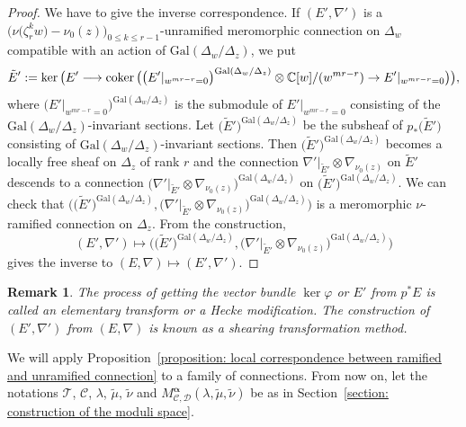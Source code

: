 \documentclass[pdftex]{sigma}
\numberwithin{equation}{section}
\newtheorem{Remark}[Theorem]{Remark}
\newcommand\coker{\mathop{\rm coker}\nolimits}
\newcommand{\balpha}{\boldsymbol \alpha}
\begin{document}
\begin{proof}
We have to give the inverse correspondence.
If $(E',\nabla')$ is a $\big(\nu\big(\zeta_r^kw\big)-\nu_0(z)\big)_{0\leq k\leq r-1}$-unramified
meromorphic connection on $\Delta_w$
compatible with an action of
$\mathrm{Gal}(\Delta_w/\Delta_z)$,
we put
\[
 \tilde{E}':=
 \ker\big( E' \longrightarrow
 \coker \big(
 \big( E'|_{w^{mr-r}=0} \big)^{ \mathrm{Gal}(\Delta_w/\Delta_z) }
 \otimes \mathbb{C}[w]/(w^{mr-r})
 \rightarrow E'|_{w^{mr-r}=0} \big) \big),
\]
where $\big( E'|_{w^{mr-r}=0} \big)^{ \mathrm{Gal}(\Delta_w/\Delta_z) }$
is the submodule of $E'|_{w^{mr-r}=0}$
consisting of the $\mathrm{Gal}(\Delta_w/\Delta_z)$-invariant sections.
Let $\big( \tilde{E}' \big)^{\mathrm{Gal}(\Delta_w/\Delta_z)}$
be the subsheaf of
$p_*\big(\tilde{E}'\big)$
consisting of $\mathrm{Gal}(\Delta_w/\Delta_z)$-invariant sections.
Then $\big( \tilde{E}' \big)^{\mathrm{Gal}(\Delta_w/\Delta_z)}$
becomes a locally free sheaf on $\Delta_z$ of rank $r$
and the connection
$\nabla'\big|_{\tilde{E}'}\otimes\nabla_{\nu_0(z)}$
on $\tilde{E}'$ descends to a connection
$\big( \nabla' \big|_{ \tilde{E}' } \otimes\nabla_{\nu_0(z)} \big) ^{ \mathrm{Gal}(\Delta_w/\Delta_z) }$
on $\big(\tilde{E}'\big)^{ \mathrm{Gal}(\Delta_w/\Delta_z) }$.
We can check that
$
 \big( \big(\tilde{E}'\big)^{ \mathrm{Gal}(\Delta_w/\Delta_z) } ,
 \big( \nabla' \big|_{ \tilde{E}' } \otimes\nabla_{\nu_0(z)} \big) ^{ \mathrm{Gal}(\Delta_w/\Delta_z) }
 \big)
$
is a meromorphic $\nu$-ramified connection on $\Delta_z$.
From the construction,
\[
 (E',\nabla')
 \mapsto
\big( \big(\tilde{E}'\big)^{ \mathrm{Gal}(\Delta_w/\Delta_z) } ,
 \big( \nabla' \big|_{ \tilde{E}' } \otimes\nabla_{\nu_0(z)}\big)^{ \mathrm{Gal}(\Delta_w/\Delta_z)}
\big)
\]
gives the inverse to
$(E,\nabla)\mapsto (E',\nabla')$.
\end{proof}

\begin{Remark}\rm
The process of getting the vector bundle $\ker\varphi$ or $E'$
from $p^*E$ is called an elementary transform
or a Hecke modification.
The construction of $(E',\nabla')$
from $(E,\nabla)$
is known \cite[Section 19.3]{Wasow}
as a shearing transformation method.
\end{Remark}

We will apply Proposition~\ref{proposition: local correspondence between ramified and unramified connection}
to a family of connections.
From now on,
let the notations
${\mathcal T}$, ${\mathcal C}$, $\lambda$, $\tilde{\mu}$, $\tilde{\nu}$
and
$M^{\balpha}_{{\mathcal C},{\mathcal D}}(\lambda,\tilde{\mu},\tilde{\nu})$
be as in Section~\ref{section: construction of the moduli space}.
\end{document}

